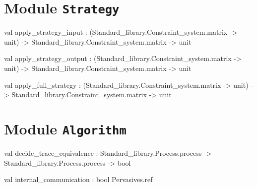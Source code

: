 \section{Module {\tt{Strategy}}}
\label{module:Strategy}


\ocamldocvspace{0.5cm}



\label{val:Strategy.apply-underscorestrategy-underscoreinput}\begin{ocamldoccode}
val apply_strategy_input :
  (Standard_library.Constraint_system.matrix -> unit) ->
  Standard_library.Constraint_system.matrix -> unit
\end{ocamldoccode}




\label{val:Strategy.apply-underscorestrategy-underscoreoutput}\begin{ocamldoccode}
val apply_strategy_output :
  (Standard_library.Constraint_system.matrix -> unit) ->
  Standard_library.Constraint_system.matrix -> unit
\end{ocamldoccode}




\label{val:Strategy.apply-underscorefull-underscorestrategy}\begin{ocamldoccode}
val apply_full_strategy :
  (Standard_library.Constraint_system.matrix -> unit) ->
  Standard_library.Constraint_system.matrix -> unit
\end{ocamldoccode}


\section{Module {\tt{Algorithm}}}
\label{module:Algorithm}


\ocamldocvspace{0.5cm}



\label{val:Algorithm.decide-underscoretrace-underscoreequivalence}\begin{ocamldoccode}
val decide_trace_equivalence :
  Standard_library.Process.process -> Standard_library.Process.process -> bool
\end{ocamldoccode}




\label{val:Algorithm.internal-underscorecommunication}\begin{ocamldoccode}
val internal_communication : bool Pervasives.ref
\end{ocamldoccode}


